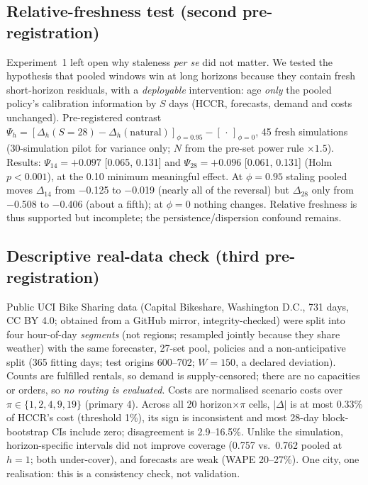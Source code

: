 \documentclass[conference]{IEEEtran}
\begin{document}
\subsection{Relative-freshness test (second pre-registration)}
Experiment~1 left open why staleness \emph{per se} did not matter. We tested the hypothesis that pooled windows win at long horizons because they contain fresh short-horizon residuals, with a \emph{deployable} intervention: age \emph{only} the pooled policy's calibration information by $S$ days (HCCR, forecasts, demand and costs unchanged). Pre-registered contrast $\Psi_h=[\Delta_h(S{=}28)-\Delta_h(\text{natural})]_{\phi=0.95}-[\,\cdot\,]_{\phi=0}$, 45 fresh simulations (30-simulation pilot for variance only; $N$ from the pre-set power rule $\times1.5$). Results: $\Psi_{14}=+0.097$ [0.065, 0.131] and $\Psi_{28}=+0.096$ [0.061, 0.131] (Holm $p<0.001$), at the 0.10 minimum meaningful effect. At $\phi{=}0.95$ staling pooled moves $\Delta_{14}$ from $-$0.125 to $-$0.019 (nearly all of the reversal) but $\Delta_{28}$ only from $-$0.508 to $-$0.406 (about a fifth); at $\phi{=}0$ nothing changes. Relative freshness is thus supported but incomplete; the persistence/dispersion confound remains.

\subsection{Descriptive real-data check (third pre-registration)}
Public UCI Bike Sharing data (Capital Bikeshare, Washington D.C., 731 days, CC BY 4.0; obtained from a GitHub mirror, integrity-checked) were split into four hour-of-day \emph{segments} (not regions; resampled jointly because they share weather) with the same forecaster, 27-set pool, policies and a non-anticipative split (365 fitting days; test origins 600--702; $W{=}150$, a declared deviation). Counts are fulfilled rentals, so demand is supply-censored; there are no capacities or orders, so \emph{no routing is evaluated}. Costs are normalised scenario costs over $\pi\in\{1,2,4,9,19\}$ (primary 4). Across all 20 horizon$\times\pi$ cells, $|\Delta|$ is at most 0.33\% of HCCR's cost (threshold 1\%), its sign is inconsistent and most 28-day block-bootstrap CIs include zero; disagreement is 2.9--16.5\%. Unlike the simulation, horizon-specific intervals did not improve coverage (0.757 vs.\ 0.762 pooled at $h{=}1$; both under-cover), and forecasts are weak (WAPE 20--27\%). One city, one realisation: this is a consistency check, not validation.
\end{document}
